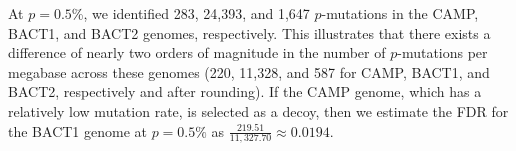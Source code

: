 At $p=0.5$\%, we identified 283, 24,393, and 1,647 $p$-mutations in the CAMP, BACT1, and BACT2 genomes, respectively. This illustrates that there exists a difference of nearly two orders of magnitude in the number of $p$-mutations per megabase across these genomes (220, 11,328, and 587 for CAMP, BACT1, and BACT2, respectively and after rounding). If the CAMP genome, which has a relatively low mutation rate, is selected as a decoy, then we estimate the FDR for the BACT1 genome at $p=0.5\%$ as $\frac{219.51}{11,327.70} \approx 0.0194$.\endinput